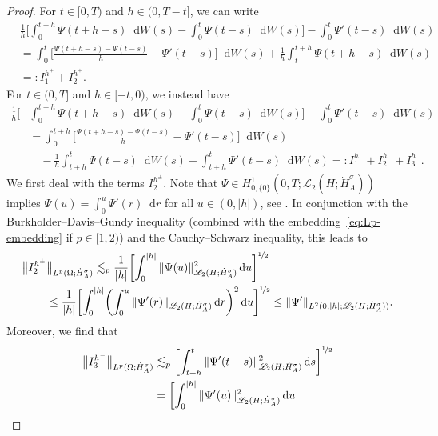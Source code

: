 \documentclass[reqno]{amsart}
\numberwithin{equation}{section}
\newcommand{\norm}[2]{     \| #1       \|_{ #2 }}
\newcommand{\rd}{\mathop{}\!\mathrm{d}}
\newcommand{\Hdot}[1]{\dot{H}^{#1}_A}
\theoremstyle{remark}
\theoremstyle{definition}
\begin{document}
\begin{proof}
	For $t \in [0,T)$ and $h \in (0,T-t]$, 
	we can write 
	\begin{align*}
	&\frac{1}{h} \biggl[ 
	\int_0^{t+h} \Psi(t+h-s)\rd W(s) - \int_0^{t} \Psi(t-s)\rd W(s) \biggr] 
	- \int_0^t \Psi'(t-s) \rd W(s) 
	\\
	&= 
	\int_0^t \biggl[ 
	\frac{\Psi(t+h-s) - \Psi(t-s)}{h} - \Psi'(t-s) \biggr] \rd W(s) 
	+ 
	\frac{1}{h}\int_t^{t+h} \Psi(t+h-s)\rd W(s) 
	\\
	&=: 
	I^{h^+}_{1} + I^{h^+}_{2}\!.
	\end{align*}
	For $t\in(0,T]$ and $h \in [-t,0)$, we instead have
	\begin{align*}
	\frac{1}{h}\biggl[ 
	&\int_0^{t+h} \Psi(t+h-s)\rd W(s) - \int_0^{t} \Psi(t-s)\rd W(s)\biggr] 
	- \int_0^t \Psi'(t-s) \rd W(s) 
	\\
	&= 
	\int_0^{t+h} 
	\biggl[ \frac{\Psi(t+h-s)-\Psi(t-s)}{h} - \Psi'(t-s)\biggr] \rd W(s) 
	\\ 
	&\quad 
	- \frac{1}{h}\int_{t+h}^t \Psi(t-s) \rd W(s) - \int_{t+h}^t \Psi'(t-s)\rd W(s) 
	=: I_1^{h^-} + I_2^{h^-} + I_3^{h^-}\!.
	\end{align*}
	We first deal with the terms $I_2^{h^\pm}$\!.
	Note that
	$\Psi \in H^1_{0,\{0\}}(0, T; \mathscr L_2(H; \Hdot{\sigma}))$
	implies $\Psi(u) = \int_0^u \Psi'(r)\rd r$ for 
	all $u \in (0, |h|)$, see \cite[\S5.9.2, Theorem~2]{Evans2010}.
	In conjunction with the Burkholder--Davis--Gundy inequality 
	(combined with the embedding~\eqref{eq:Lp-embedding}
	if $p\in[1,2)$) and the Cauchy--Schwarz inequality,
	this leads to 
	\begin{align*}
	\bigl\| I_2^{h^\pm} 
	&\bigr\|_{L^p(\Omega;\Hdot\sigma)} 
	\lesssim_{p} 
	\frac{1}{|h|} 
	\biggl[ \int_0^{|h|} 
	\norm{\Psi(u)}{\mathscr L_2(H;\Hdot\sigma)}^2 \rd u \biggr]^{\nicefrac{1}{2}}  
	\\
	&\leq 
	\frac{1}{|h|} 
	\biggl[ \int_0^{|h|} 
	\biggl(\int_0^u \norm{\Psi'(r)}{\mathscr L_2(H;\Hdot\sigma)} \rd r\biggr)^2 
	\rd u\biggr]^{\nicefrac{1}{2}} 
	\leq
	\norm{\Psi'}{L^2(0,|h|;\mathscr L_2(H;\Hdot\sigma))}.
	\end{align*}
	Moreover, we find that 
	\begin{align*} 
	\bigl\| I_3^{h^-} \bigr\|_{L^p(\Omega;\Hdot \sigma)} 
	&\lesssim_p 
	\biggl[\int_{t+h}^t 
	\norm{\Psi'(t-s)}{\mathscr L_2(H; \Hdot{\sigma})}^2 \rd s\biggr]^{\nicefrac{1}{2}} 
	\\
	&= 
	\biggl[\int_{0}^{|h|} 
	\norm{\Psi'(u)}{\mathscr L_2(H; \Hdot{\sigma})}^2 \rd u 

\end{align*}
\end{proof}
\end{document}
